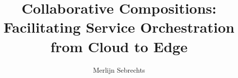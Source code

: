 %
%

\title{Collaborative Compositions: Facilitating Service Orchestration from Cloud to Edge}
\author{Merlijn Sebrechts}









